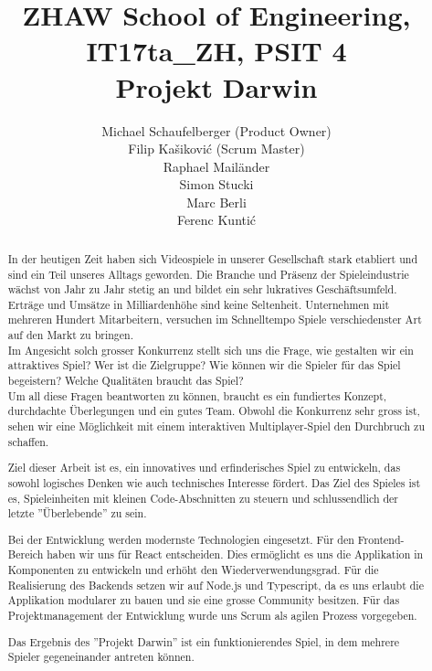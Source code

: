 \documentclass[11pt,a4paper,titlepage]{article}
\author{
Michael Schaufelberger (Product Owner)\\
Filip Kašiković (Scrum Master)\\
Raphael Mailänder\\
Simon Stucki\\
Marc Berli\\
Ferenc Kuntić}
\title{{\small ZHAW School of Engineering, 
IT17ta\_ZH, 
PSIT 4}\\
Projekt Darwin}
\begin{document}
\maketitle

\begin{otherlanguage}{english}
\begin{abstract}

In der heutigen Zeit haben sich Videospiele in unserer Gesellschaft stark etabliert und sind ein Teil unseres Alltags geworden. Die Branche und Präsenz der Spieleindustrie wächst von Jahr zu Jahr stetig an und bildet ein sehr lukratives Geschäftsumfeld. Erträge und Umsätze in Milliardenhöhe sind keine Seltenheit. Unternehmen mit mehreren Hundert Mitarbeitern, versuchen im Schnelltempo Spiele verschiedenster Art auf den Markt zu bringen. 
\\Im Angesicht solch grosser Konkurrenz stellt sich uns die Frage, wie gestalten wir ein attraktives Spiel? Wer ist die Zielgruppe? Wie können wir die Spieler für das Spiel begeistern? Welche Qualitäten braucht das Spiel?
\\Um all diese Fragen beantworten zu können, braucht es ein fundiertes Konzept, durchdachte Überlegungen und ein gutes Team. Obwohl die Konkurrenz sehr gross ist, sehen wir eine Möglichkeit mit einem interaktiven Multiplayer-Spiel den Durchbruch zu schaffen.

Ziel dieser Arbeit ist es, ein innovatives und erfinderisches Spiel zu entwickeln, das sowohl logisches Denken wie auch technisches Interesse fördert. Das Ziel des Spieles ist es, Spieleinheiten mit kleinen Code-Abschnitten zu steuern und schlussendlich der letzte ''Überlebende'' zu sein.

Bei der Entwicklung werden modernste Technologien eingesetzt. Für den Frontend-Bereich haben wir uns für React entscheiden. Dies ermöglicht es uns die Applikation in Komponenten zu entwickeln und erhöht den Wiederverwendungsgrad. Für die Realisierung des Backends setzen wir auf Node.js und Typescript, da es uns erlaubt die Applikation modularer zu bauen und sie eine grosse Community besitzen.
Für das Projektmanagement der Entwicklung wurde uns Scrum als agilen Prozess vorgegeben.

Das Ergebnis des ''Projekt Darwin'' ist ein funktionierendes Spiel, in dem mehrere Spieler gegeneinander antreten können.

\end{abstract}
\end{otherlanguage}
\end{document}
